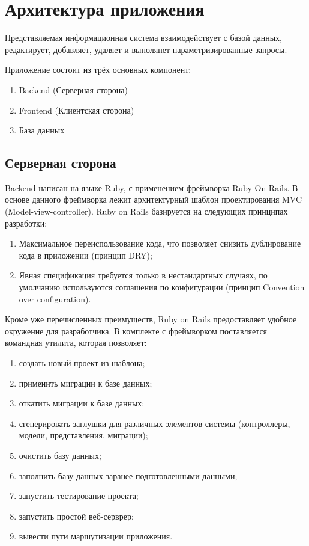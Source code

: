 \section{Архитектура приложения}
{
  Представляемая информационная система взаимодействует с базой данных, редактирует,
  добавляет, удаляет и выполянет параметризированные запросы.

  Приложение состоит из трёх основных компонент:
  \begin{enumerate}
    \item {Backend (Серверная сторона)}
    \item {Frontend (Клиентская сторона)}
    \item {База данных}
  \end{enumerate}

  \subsection{Серверная сторона}

  Backend написан на языке Ruby, с применением фреймворка Ruby On Rails. В основе данного фреймворка лежит архитектурный шаблон проектирования MVC (Model-view-controller). Ruby on Rails базируется на следующих принципах разработки:

  \begin{enumerate}
    \item {Максимальное переиспользование кода, что позволяет снизить дублирование кода в приложении (принцип DRY);}
    \item {Явная спецификация требуется только в нестандартных случаях, по умолчанию используются соглашения по конфигурации (принцип Convention over configuration).}
  \end{enumerate}

  Кроме уже перечисленных преимуществ, Ruby on Rails предоставляет удобное окружение для разработчика. В комплекте с фреймворком поставляется командная утилита, которая позволяет:

  \begin{enumerate}
    \item создать новый проект из шаблона;
    \item применить миграции к базе данных;
    \item откатить миграции к базе данных;
    \item сгенерировать заглушки для различных элементов системы (контроллеры, модели, представления, миграции);
    \item очистить базу данных;
    \item заполнить базу данных заранее подготовленными данными;
    \item запустить тестирование проекта;
    \item запустить простой веб-серврер;
    \item вывести пути маршутизации приложения.
  \end{enumerate}

}
